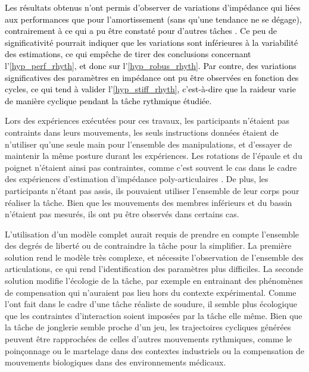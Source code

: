 \textcolor{black}{Les résultats obtenus n'ont permis d'observer de variations d'impédance qui liées aux performances que pour l'amortissement (sans qu'une tendance ne se dégage), contrairement à ce qui a pu être constaté pour d'autres tâches \parencite{erden_hand_2015}. Ce peu de significativité pourrait indiquer que les variations sont inférieures à la variabilité des estimations, ce qui empêche de tirer des conclusions concernant l'\cref{hyp_perf_rhyth}, et donc sur l'\cref{hyp_robus_rhyth}. Par contre, des variations significatives des paramètres en impédance ont pu être observées en fonction des cycles, ce qui tend à valider l'\cref{hyp_stiff_rhyth}, c'est-à-dire que la raideur varie de manière cyclique pendant la tâche rythmique étudiée.}

Lors des expériences exécutées pour ces travaux, les participants n'étaient pas contraints dans leurs mouvements, les seuls instructions données étaient de n'utiliser qu'une seule main pour l'ensemble des manipulations, et d'essayer de maintenir la même posture durant les expériences. Les rotations de l'épaule et du poignet n'étaient ainsi pas contraintes, comme c'est souvent le cas dans le cadre des expériences d'estimation d'impédance poly-articulaires \parencite{mussa-ivaldi_neural_1985,gomi_task-dependent_1998}. De plus, les participants n'étant pas assis, ils pouvaient utiliser l'ensemble de leur corps pour réaliser la tâche. Bien que les mouvements des membres inférieurs et du bassin n'étaient pas mesurés, ils ont pu être observés dans certains cas.

L'utilisation d'un modèle complet aurait requis de prendre en compte l'ensemble des degrés de liberté ou de contraindre la tâche pour la simplifier. La première solution rend le modèle très complexe, et nécessite l'observation de l'ensemble des articulations, ce qui rend l'identification des paramètres plus difficiles. La seconde solution modifie l'écologie de la tâche, par exemple en entrainant des phénomènes de compensation qui n'auraient pas lieu hors du contexte expérimental. Comme l'ont fait \textcite{erden_hand_2015} dans le cadre d'une tâche réaliste de soudure, il semble plus écologique que les contraintes d'interaction soient imposées par la tâche elle même. Bien que la tâche de jonglerie semble proche d'un jeu, les trajectoires cycliques générées peuvent être rapprochées de celles d'autres mouvements rythmiques, comme le poinçonnage ou le martelage dans des contextes industriels ou la compensation de mouvements biologiques dans des environnements médicaux. 

